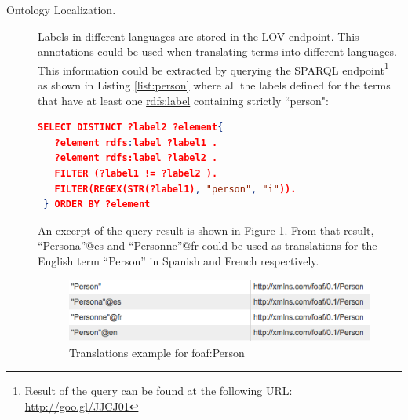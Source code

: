 \documentclass{iosart2c}
\begin{document}
\begin{description}
 \item [Ontology Localization.] Labels in different languages are stored in the LOV endpoint. This annotations could be used when translating terms into different languages. This information could be extracted by querying the SPARQL endpoint\footnote{Result of the query can be found at the following URL: \url{http://goo.gl/JJCJ01}} as shown in Listing \ref{list:person} where all the labels defined for the terms that have at least one \url{rdfs:label} containing strictly ``person":
		
    \begin{lstlisting}[basicstyle=\tiny,float=htb,caption={SPARQL query asking all the labels defined for the terms containing person.},label=list:person, language=json]
 SELECT DISTINCT ?label2 ?element{
   ?element rdfs:label ?label1 .
   ?element rdfs:label ?label2 .
   FILTER (?label1 != ?label2 ).
   FILTER(REGEX(STR(?label1), "person", "i")).
 } ORDER BY ?element
	\end{lstlisting}
							
   An excerpt of the query result is shown in Figure \ref{fig:translations}. From that result, ``Persona''@es and ``Personne''@fr could be used as translations for the English term ``Person'' in Spanish and French respectively. 
   
   \begin{figure}[ht!b]
     \centering
     \includegraphics[width=.90\linewidth]{translations1.png}
     \caption{Translations example for foaf:Person}
     \label{fig:translations}
   \end{figure}
   
\end{description}
\end{document}
